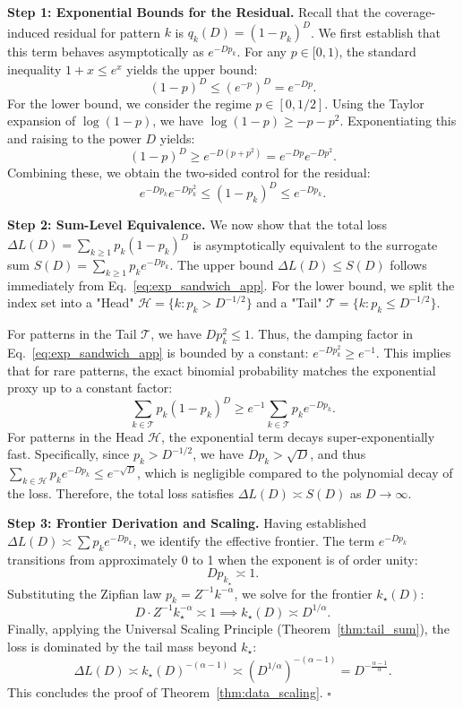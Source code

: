 \documentclass{article}
\theoremstyle{plain}
\theoremstyle{definition}
\theoremstyle{remark}
\begin{document}
\textbf{Step 1: Exponential Bounds for the Residual.}
Recall that the coverage-induced residual for pattern $k$ is $q_k(D) = (1-p_k)^D$. We first establish that this term behaves asymptotically as $e^{-D p_k}$.
For any $p \in [0, 1)$, the standard inequality $1+x \le e^x$ yields the upper bound:
\begin{equation*}
    (1-p)^D \le (e^{-p})^D = e^{-Dp}.
\end{equation*}
For the lower bound, we consider the regime $p \in [0, 1/2]$. Using the Taylor expansion of $\log(1-p)$, we have $\log(1-p) \ge -p - p^2$. Exponentiating this and raising to the power $D$ yields:
\begin{equation*}
    (1-p)^D \ge e^{-D(p+p^2)} = e^{-Dp} e^{-Dp^2}.
\end{equation*}
Combining these, we obtain the two-sided control for the residual:
\begin{equation}
    \label{eq:exp_sandwich_app}
    e^{-Dp_k} e^{-Dp_k^2} \le (1-p_k)^D \le e^{-Dp_k}.
\end{equation}

\textbf{Step 2: Sum-Level Equivalence.}
We now show that the total loss $\Delta L(D) = \sum_{k \ge 1} p_k (1-p_k)^D$ is asymptotically equivalent to the surrogate sum $S(D) = \sum_{k \ge 1} p_k e^{-D p_k}$.
The upper bound $\Delta L(D) \le S(D)$ follows immediately from Eq.~\eqref{eq:exp_sandwich_app}. For the lower bound, we split the index set into a "Head" $\mathcal{H} = \{k : p_k > D^{-1/2}\}$ and a "Tail" $\mathcal{T} = \{k : p_k \le D^{-1/2}\}$.

For patterns in the Tail $\mathcal{T}$, we have $D p_k^2 \le 1$. Thus, the damping factor in Eq.~\eqref{eq:exp_sandwich_app} is bounded by a constant: $e^{-D p_k^2} \ge e^{-1}$. This implies that for rare patterns, the exact binomial probability matches the exponential proxy up to a constant factor:
\[
\sum_{k \in \mathcal{T}} p_k (1-p_k)^D \ge e^{-1} \sum_{k \in \mathcal{T}} p_k e^{-D p_k}.
\]
For patterns in the Head $\mathcal{H}$, the exponential term decays super-exponentially fast. Specifically, since $p_k > D^{-1/2}$, we have $D p_k > \sqrt{D}$, and thus $\sum_{k \in \mathcal{H}} p_k e^{-D p_k} \le e^{-\sqrt{D}}$, which is negligible compared to the polynomial decay of the loss.
Therefore, the total loss satisfies $\Delta L(D) \asymp S(D)$ as $D \to \infty$.

\textbf{Step 3: Frontier Derivation and Scaling.}
Having established $\Delta L(D) \asymp \sum p_k e^{-D p_k}$, we identify the effective frontier. The term $e^{-D p_k}$ transitions from approximately 0 to 1 when the exponent is of order unity:
\[
D p_{k_\star} \asymp 1.
\]
Substituting the Zipfian law $p_k = Z^{-1} k^{-\alpha}$, we solve for the frontier $k_\star(D)$:
\[
D \cdot Z^{-1} k_\star^{-\alpha} \asymp 1 \implies k_\star(D) \asymp D^{1/\alpha}.
\]
Finally, applying the Universal Scaling Principle (Theorem~\ref{thm:tail_sum}), the loss is dominated by the tail mass beyond $k_\star$:
\[
\Delta L(D) \asymp k_\star(D)^{-(\alpha-1)} \asymp \left( D^{1/\alpha} \right)^{-(\alpha-1)} = D^{-\frac{\alpha-1}{\alpha}}.
\]
This concludes the proof of Theorem~\ref{thm:data_scaling}. \hfill $\square$
\end{document}
